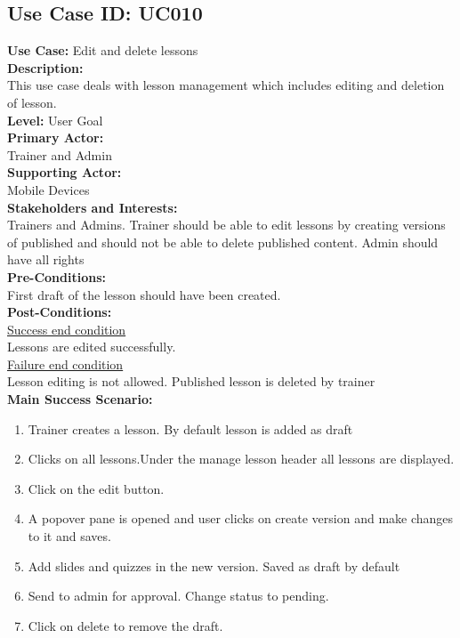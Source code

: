 \documentclass{report}
\begin{document}
\subsection{\textbf{Use Case ID:} UC010}
\textbf{Use Case:} Edit and delete lessons\\[0.3cm]
\textbf{Description:}\\
This use case deals with lesson management which includes editing and deletion of lesson.\\[0.3cm]
\textbf{Level:} User Goal\\[0.3cm]
\textbf{Primary Actor:}\\
Trainer and Admin\\[0.3cm]
\textbf{Supporting Actor:}\\
Mobile Devices\\[0.3cm]
\textbf{Stakeholders and Interests:}\\
Trainers and Admins. Trainer should be able to edit lessons by creating versions of published and should not be able to delete published content. Admin should have all rights\\[0.3cm]
\textbf{Pre-Conditions:}\\
First draft of the lesson should have been created.\\[0.3cm]
\textbf{Post-Conditions:}\\
\underline{Success end condition}\\
Lessons are edited successfully.\\[0.3cm]
\underline{Failure end condition}\\
Lesson editing is not allowed. Published lesson is deleted by trainer\\[0.3cm]
\textbf{\large {Main Success Scenario:}}
\begin{enumerate}
    \item Trainer creates a lesson. By default lesson is added as draft
    \item Clicks on all lessons.Under the manage lesson header all lessons are displayed.
    \item Click on the edit button.
    \item A popover pane is opened and user clicks on create version and make changes to it and saves.
    \item Add slides and quizzes in the new version. Saved as draft by default
    \item Send to admin for approval. Change status to pending.
    \item Click on delete to remove the draft.
\end{enumerate}
\end{document}
